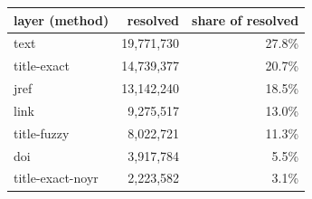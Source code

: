 \begin{tabular}{lrr}
\toprule
layer (method) & resolved & share of resolved \\
\midrule
text & 19,771,730 & 27.8\% \\
title-exact & 14,739,377 & 20.7\% \\
jref & 13,142,240 & 18.5\% \\
link & 9,275,517 & 13.0\% \\
title-fuzzy & 8,022,721 & 11.3\% \\
doi & 3,917,784 & 5.5\% \\
title-exact-noyr & 2,223,582 & 3.1\% \\
\bottomrule
\end{tabular}
